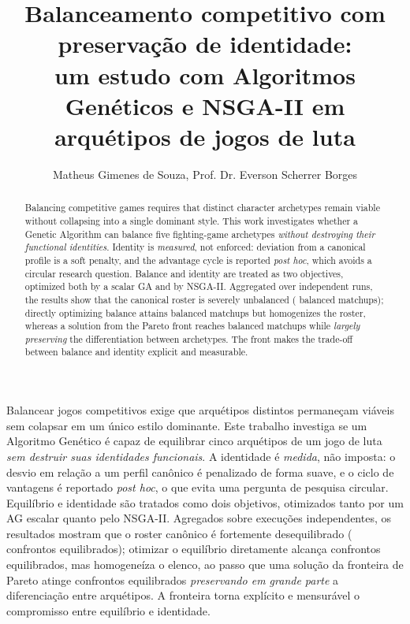 \documentclass[12pt]{article}
\title{Balanceamento competitivo com preservação de identidade:\\
um estudo com Algoritmos Genéticos e NSGA-II em\\
arquétipos de jogos de luta}
\author{Matheus Gimenes de Souza\inst{1}, Prof. Dr. Everson Scherrer Borges\inst{1}}
\begin{document}
\maketitle

\begin{abstract}
  Balancing competitive games requires that distinct character archetypes remain
  viable without collapsing into a single dominant style. This work investigates
  whether a Genetic Algorithm can balance five fighting-game archetypes
  \emph{without destroying their functional identities}. Identity is
  \emph{measured}, not enforced: deviation from a canonical profile is a soft
  penalty, and the advantage cycle is reported \emph{post hoc}, which avoids a
  circular research question. Balance and identity are treated as two objectives,
  optimized both by a scalar GA and by NSGA-II. Aggregated over \nSeeds{} independent
  runs, the results show that the canonical roster is severely unbalanced
  (\eqCan{} balanced matchups); directly optimizing balance attains
  \eqAg{} balanced matchups but homogenizes the roster, whereas a solution
  from the Pareto front reaches \eqBd{} balanced matchups while \emph{largely preserving}
  the differentiation between archetypes. The front makes the trade-off between
  balance and identity explicit and measurable.
\end{abstract}

\begin{resumo}
  Balancear jogos competitivos exige que arquétipos distintos permaneçam viáveis
  sem colapsar em um único estilo dominante. Este trabalho investiga se um
  Algoritmo Genético é capaz de equilibrar cinco arquétipos de um jogo de luta
  \emph{sem destruir suas identidades funcionais}. A identidade é \emph{medida},
  não imposta: o desvio em relação a um perfil canônico é penalizado de forma
  suave, e o ciclo de vantagens é reportado \emph{post hoc}, o que evita uma
  pergunta de pesquisa circular. Equilíbrio e identidade são tratados como dois
  objetivos, otimizados tanto por um AG escalar quanto pelo NSGA-II. Agregados
  sobre \nSeeds{} execuções independentes, os resultados mostram que o roster
  canônico é fortemente desequilibrado (\eqCan{} confrontos equilibrados);
  otimizar o equilíbrio diretamente alcança \eqAg{} confrontos equilibrados, mas
  homogeneíza o elenco, ao passo que uma solução da fronteira de Pareto atinge
  \eqBd{} confrontos equilibrados \emph{preservando em grande parte} a diferenciação entre
  arquétipos. A fronteira torna explícito e mensurável o compromisso entre
  equilíbrio e identidade.
\end{resumo}
\end{document}
